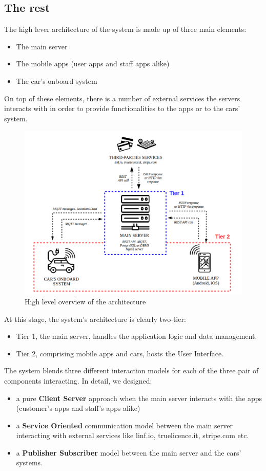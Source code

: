 \documentclass[11pt]{article} %
\begin{document}
\subsection{The rest}

The high lever architecture of the system is made up of three main elements:
\begin{itemize}[noitemsep]
	\item The main server
	\item The mobile apps (user apps and staff apps alike)
	\item The car's onboard system
\end{itemize}
On top of these elements, there is a number of external services the servers interacts with in order to provide functionalities to the apps or to the cars' system.

\begin{figure}[H]
	\centering
	\includegraphics[width=1\textwidth]{proposed_system.png}
	\caption{High level overview of the architecture}
\end{figure}	

At this stage, the system's architecture is clearly two-tier:
\begin{itemize}[noitemsep]
	\item Tier 1, the main server, handles the application logic and data management.
	\item Tier 2, comprising mobile apps and cars, hosts the User Interface.
\end{itemize}

The system blends three different interaction models for each of the three pair of components interacting. In detail, we designed:
\begin{itemize}
	\item a pure \textbf{Client Server} approach when the main server interacts with the apps (customer's apps and staff's apps alike)
	\item a \textbf{Service Oriented} communication model between the main server interacting with external services like linf.io, truelicence.it, stripe.com etc.
	\item a \textbf{Publisher Subscriber} model between the main server and the cars' systems.
\end{itemize}
\end{document}
